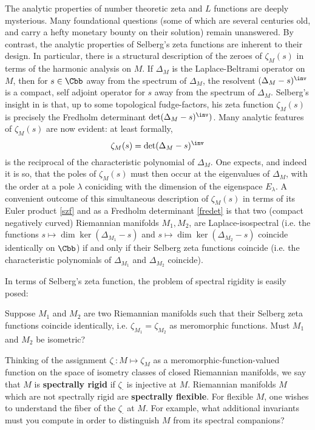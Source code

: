 \documentclass[11pt]{article}
\begin{document}
	The analytic properties of number theoretic zeta and $L$ functions are deeply mysterious. Many foundational questions  (some of which are several centuries  old, and carry a hefty monetary bounty on their solution) remain unanswered.  By contrast, the analytic properties of Selberg's zeta functions are inherent to their design. In particular, there is a structural description of the zeroes of $\zeta_M(s)$  in terms of the harmonic analysis on $M$. If $\Delta_M$ is the Laplace-Beltrami operator on $M$, then for $s \in \Cbb$ away from the spectrum of $\Delta_M$, the resolvent $ (\Delta _M- s )^\inv$  is a compact, self adjoint operator for $s$ away from the spectrum of $\Delta_M$.  Selberg's insight in  \cite{selberg1956harmonic} is that, up to some topological fudge-factors,  his zeta function $\zeta_M(s)$ is precisely the Fredholm determinant $\det(\Delta_M - s)^\inv )$.  Many analytic features of $\zeta_M(s)$ are now evident: at least formally, 
	\[ \zeta_M(s) = \det(\Delta_M - s)^\inv \label{fredet} \] 
	is the reciprocal of the characteristic polynomial  of $\Delta_M$. One expects, and indeed it is so, that the poles of $\zeta_M(s)$ must then occur at the eigenvalues of  $\Delta_M$, with the order at a pole $\lambda$  coniciding with the dimension of the eigenspace $E_\lambda$.  A convenient outcome of this simultaneous description of $\zeta_M(s)$  in terms of its Euler product \ref{szf} and as a Fredholm determinant \ref{fredet}  is that two (compact negatively curved) Riemannian manifolds $M_1,M_2$, are Laplace-isospectral (i.e.  the functions $s \mapsto \dim \ker(\Delta_{M_1}  - s)$ and $s \mapsto \dim \ker(\Delta_{M_2}  - s)$ coincide identically on $\Cbb$)   if and only if their Selberg zeta functions coincide (i.e.  the characteristic polynomials of $\Delta_{M_1}$ and $\Delta_{M_2}$ coincide). 
	
	
	In terms of Selberg's zeta function, the problem of spectral rigidity is easily posed: 
	\begin{mdframed}
		Suppose $M_1$ and $M_2$ are two Riemannian manifolds such that their Selberg zeta functions coincide identically, i.e.  $\zeta_{M_1}= \zeta_{M_2}$ as meromorphic functions.  Must $M_1$ and $M_2$ be isometric? 	
	\end{mdframed}
	Thinking of the assignment $\zeta_\cdot : M \mapsto \zeta_M$ as a meromorphic-function-valued function on the space of isometry classes of closed Riemannian manifolds, we say that $M$ is {\bf spectrally rigid} if $\zeta_\cdot $ is injective at $M$.  Riemannian manifolds $M$ which are not spectrally rigid are {\bf spectrally flexible}. For flexible $M$, one wishes to understand the fiber of the $\zeta_\cdot $ at $M$. For example, what additional invariants must you compute in order to distinguish $M$ from its spectral companions?
	
\end{document}
